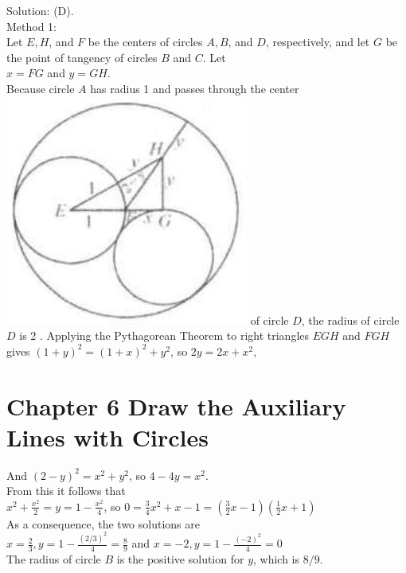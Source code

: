 \documentclass[10pt]{article}
\begin{document}
Solution: (D).\\
Method 1:\\
Let \(E, H\), and \(F\) be the centers of circles \(A, B\), and \(D\), respectively, and let \(G\) be the point of tangency of circles \(B\) and \(C\). Let\\
\(x=F G\) and \(y=G H\).\\
Because circle \(A\) has radius 1 and passes through the center\\
\includegraphics[max width=\textwidth]{2025_04_17_97bc1f7e44d93c271a88g-180(2)} of circle \(D\), the radius of circle \(D\) is 2 . Applying the Pythagorean Theorem to right triangles \(E G H\) and \(F G H\) gives \((1+y)^{2}=(1+x)^{2}+y^{2}\), so \(2 y=2 x+x^{2}\),

\section*{Chapter 6 Draw the Auxiliary Lines with Circles}
And \((2-y)^{2}=x^{2}+y^{2}\), so \(4-4 y=x^{2}\).\\
From this it follows that\\
\(x^{2}+\frac{x^{2}}{2}=y=1-\frac{x^{2}}{4}\), so \(0=\frac{3}{4} x^{2}+x-1=\left(\frac{3}{2} x-1\right)\left(\frac{1}{2} x+1\right)\)\\
As a consequence, the two solutions are\\
\(x=\frac{2}{3}, y=1-\frac{(2 / 3)^{2}}{4}=\frac{8}{9}\) and \(x=-2, y=1-\frac{(-2)^{2}}{4}=0\)\\
The radius of circle \(B\) is the positive solution for \(y\), which is \(8 / 9\).
\end{document}
